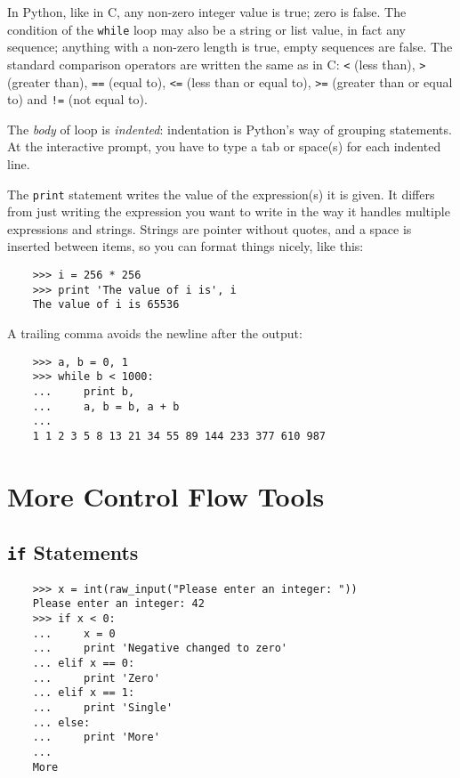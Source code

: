 \documentclass[UTF8]{article}
\begin{document}
In Python, like in C, any non-zero integer value is true; zero is false. The condition of the
\texttt{while} loop may also be a string or list value, in fact any sequence; anything with a
non-zero length is true, empty sequences are false. The standard comparison operators are written
the same as in C: \texttt{<} (less than), \texttt{>} (greater than), \texttt{==} (equal to),
\texttt{<=} (less than or equal to), \texttt{>=} (greater than or equal to) and \texttt{!=} (not
equal to).

The \emph{body} of loop is \emph{indented}: indentation is Python's way of grouping statements.
At the interactive prompt, you have to type a tab or space(s) for each indented line.

The \texttt{print} statement writes the value of the expression(s) it is given. It differs from
just writing the expression you want to write in the way it handles multiple expressions and
strings. Strings are pointer without quotes, and a space is inserted between items, so you can
format things nicely, like this:
\begin{verbatim}
    >>> i = 256 * 256
    >>> print 'The value of i is', i
    The value of i is 65536
\end{verbatim}

A trailing comma avoids the newline after the output:
\begin{verbatim}
    >>> a, b = 0, 1
    >>> while b < 1000:
    ...     print b,
    ...     a, b = b, a + b
    ...
    1 1 2 3 5 8 13 21 34 55 89 144 233 377 610 987
\end{verbatim}

\section{More Control Flow Tools}
\subsection{\texttt{if} Statements}
\begin{verbatim}
    >>> x = int(raw_input("Please enter an integer: "))
    Please enter an integer: 42
    >>> if x < 0:
    ...     x = 0
    ...     print 'Negative changed to zero'
    ... elif x == 0:
    ...     print 'Zero'
    ... elif x == 1:
    ...     print 'Single'
    ... else:
    ...     print 'More'
    ...
    More
\end{verbatim}
\end{document}
